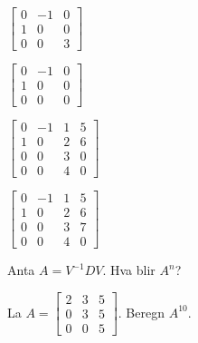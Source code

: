 \begin{oppgave}
\begin{punkt}
$\begin{bmatrix}
0 & -1 & 0\\
1 & 0 & 0\\
0 & 0 & 3
\end{bmatrix}$
\end{punkt}


\begin{punkt}
$\begin{bmatrix}
0 & -1 & 0\\
1 & 0 & 0\\
0 & 0 & 0
\end{bmatrix}$
\end{punkt}

\begin{punkt}
$\begin{bmatrix}
0 & -1 & 1& 5\\
1 & 0 & 2& 6\\
0 & 0 & 3 & 0\\
0 & 0 & 4 & 0
\end{bmatrix}$
\end{punkt}


\begin{punkt}
$\begin{bmatrix}
0 & -1 & 1& 5\\
1 & 0 & 2& 6\\
0 & 0 & 3 & 7\\
0 & 0 & 4 & 0
\end{bmatrix}$
\end{punkt}

\end{oppgave}

\begin{oppgave}
Anta $A=V^{-1}DV$. 
Hva blir $A^n$? 
\end{oppgave}

\begin{oppgave}
La
$A=\begin{bmatrix}
2 & 3 & 5\\
0 & 3 & 5\\
0 & 0 & 5
\end{bmatrix}$. Beregn $A^{10}$.
\end{oppgave}


